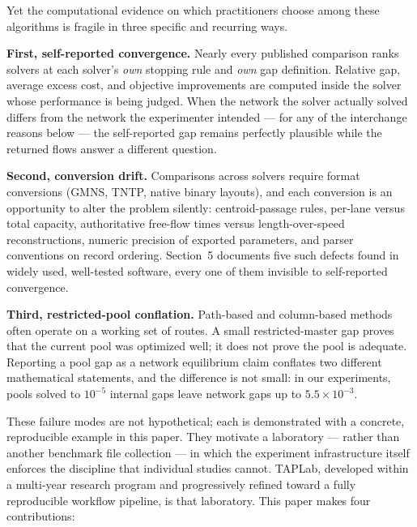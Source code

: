 \documentclass[11pt]{article}
\begin{document}
Yet the computational evidence on which practitioners choose among these
algorithms is fragile in three specific and recurring ways.

\textbf{First, self-reported convergence.} Nearly every published
comparison ranks solvers at each solver's \emph{own} stopping rule and
\emph{own} gap definition. Relative gap, average excess cost, and objective
improvements are computed inside the solver whose performance is being
judged. When the network the solver actually solved differs from the
network the experimenter intended --- for any of the interchange reasons
below --- the self-reported gap remains perfectly plausible while the
returned flows answer a different question.

\textbf{Second, conversion drift.} Comparisons across solvers require
format conversions (GMNS, TNTP, native binary layouts), and each conversion
is an opportunity to alter the problem silently: centroid-passage rules,
per-lane versus total capacity, authoritative free-flow times versus
length-over-speed reconstructions, numeric precision of exported
parameters, and parser conventions on record ordering. Section~5 documents
five such defects found in widely used, well-tested software, every one of
them invisible to self-reported convergence.

\textbf{Third, restricted-pool conflation.} Path-based and column-based
methods often operate on a working set of routes. A small restricted-master
gap proves that the current pool was optimized well; it does not prove the
pool is adequate. Reporting a pool gap as a network equilibrium claim
conflates two different mathematical statements, and the difference is not
small: in our experiments, pools solved to $10^{-5}$ internal gaps leave
network gaps up to $5.5\times10^{-3}$.

These failure modes are not hypothetical; each is demonstrated with a
concrete, reproducible example in this paper. They motivate a laboratory
--- rather than another benchmark file collection --- in which the
experiment infrastructure itself enforces the discipline that individual
studies cannot. TAPLab, developed within a multi-year research program and
progressively refined toward a fully reproducible workflow pipeline, is
that laboratory. This paper makes four contributions:
\end{document}
